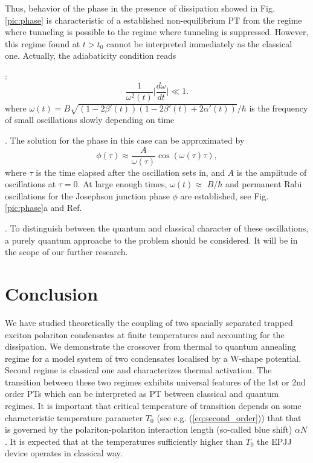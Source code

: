 \documentclass[aps, pre, preprint, groupedaddress, superscriptaddress, showkeys, showpacs] {revtex4-1}
\begin{document}
Thus, behavior of the phase in the presence of dissipation showed in Fig. \ref{pic:phase} is characteristic of a established non-equilibrium PT from the regime where tunneling is possible to the regime where tunneling is suppressed.
However, this regime found at $t>t_0$ cannot be interpreted immediately as the classical one.
Actually, the adiabaticity condition reads {\cite{Sols}:
%
\begin{equation}
\dfrac{1}{\omega^2(t)} \Big| \dfrac{d \omega}{d t} \Big| \ll 1.
\end{equation}
%
where $\omega(t) = B \sqrt{(1 - 2 \beta'(t))(1 - 2 \beta'(t) + 2 \alpha'(t))}/ \hbar $ is the frequency of small oscillations slowly depending on time {\cite{Sedov}. 
The solution for the phase in this case can be approximated by 
\begin{equation}
\phi(\tau) \approx \dfrac{A}{\omega(\tau)} \cos (\omega(\tau) \tau),
\end{equation}
%
where $\tau$ is the time elapsed after the oscillation sets in, and $A$ is the amplitude of oscillations at $\tau = 0$.
At large enough times, $\omega(t) \approx$ $B/ \hbar$ and permanent Rabi  oscillations for the Josephson junction phase $\phi$ are established, see Fig. \ref{pic:phase}a and Ref. {\cite{Permamemt}.
To distinguish between the quantum and classical character of these oscillations, a purely quantum approache to the problem should be considered.      
It will be in the scope of our further research.

\section{Conclusion \label{sec:conclusion}}

We have studied theoretically the coupling of two spacially separated trapped exciton polariton condensates at finite temperatures and accounting for the dissipation.
We demonstrate the crossover from thermal to quantum annealing regime for a model system of two condensates localised by a W-shape potential.
Second regime is classical one and characterizes  thermal activation.
The transition between these two regimes exhibits universal features of the 1st or 2nd order PTs which can be interpreted as PT between classical and quantum regimes. It is important that critical temperature of transition depends on some  characteristic temperature  parameter $T_{0}$ (see e.g. (\ref{eq:second_order})) that that is governed by the polariton-polariton interaction length (so-called blue shift) $\alpha N$.  It is expected that  at the temperatures sufficiently higher than  $T_{0}$ the EPJJ device operates in classical way. 

}}}
\end{document}
